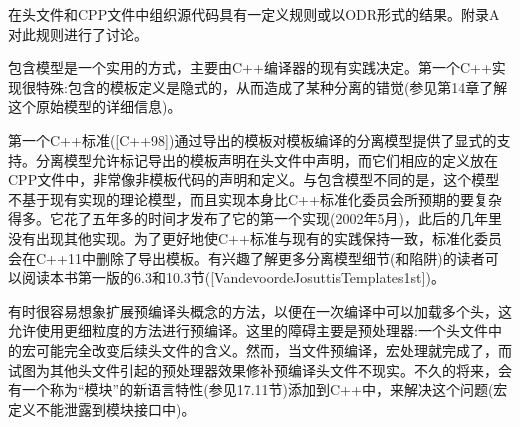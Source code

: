 在头文件和CPP文件中组织源代码具有一定义规则或以ODR形式的结果。附录A对此规则进行了讨论。

包含模型是一个实用的方式，主要由C++编译器的现有实践决定。第一个C++实现很特殊:包含的模板定义是隐式的，从而造成了某种分离的错觉(参见第14章了解这个原始模型的详细信息)。

第一个C++标准([C++98])通过导出的模板对模板编译的分离模型提供了显式的支持。分离模型允许标记导出的模板声明在头文件中声明，而它们相应的定义放在CPP文件中，非常像非模板代码的声明和定义。与包含模型不同的是，这个模型不基于现有实现的理论模型，而且实现本身比C++标准化委员会所预期的要复杂得多。它花了五年多的时间才发布了它的第一个实现(2002年5月)，此后的几年里没有出现其他实现。为了更好地使C++标准与现有的实践保持一致，标准化委员会在C++11中删除了导出模板。有兴趣了解更多分离模型细节(和陷阱)的读者可以阅读本书第一版的6.3和10.3节([VandevoordeJosuttisTemplates1st])。

有时很容易想象扩展预编译头概念的方法，以便在一次编译中可以加载多个头，这允许使用更细粒度的方法进行预编译。这里的障碍主要是预处理器:一个头文件中的宏可能完全改变后续头文件的含义。然而，当文件预编译，宏处理就完成了，而试图为其他头文件引起的预处理器效果修补预编译头文件不现实。不久的将来，会有一个称为“模块”的新语言特性(参见17.11节)添加到C++中，来解决这个问题(宏定义不能泄露到模块接口中)。